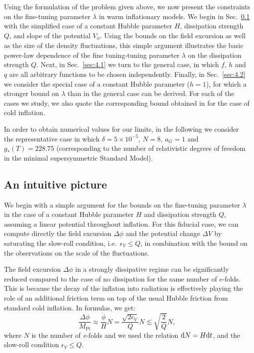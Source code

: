 \documentclass[aps,prd,twocolumn,amssymb,amsmath,floatfix,nofootinbib,superscriptaddress,preprintnumbers]{revtex4-1}
\begin{document}
Using the formulation of the problem given above,
we now present the constraints on the fine-tuning parameter $\lambda$ in warm inflationary models. We begin in Sec.~\ref{sec:4.0} with the simplified case of a constant Hubble parameter $H$, dissipation strength $Q$, and slope of the potential $V_\phi$. Using the bounds on the field excursion as well as the size of the density fluctuations, this simple argument illustrates the basic power-law dependence of the fine tuning-tuning parameter $\lambda$ on the dissipation strength $Q$. Next, in Sec.~\ref{sec:4.1} we turn to the general case, in which $f$, $h$ and $q$ are all arbitrary functions to be chosen independently. Finally, in Sec.~\ref{sec:4.2} we consider the special case of a constant Hubble parameter ($h =1$), for which a stronger bound on $\lambda$ than in the general case can be derived. For each of the cases we study, we also quote the corresponding bound obtained in \cite{Adams:1990pn} for the case of cold inflation.

In order to obtain numerical values for our limits, in the following we consider the representative case in which $\delta = 5\times 10^{-5}$, $N=8$, $a_G=1$ and $g_{*}(T)=228.75$ (corresponding to the number of relativistic degrees of freedom in the minimal supersymmetric Standard Model). 

\subsection{An intuitive picture}
\label{sec:4.0}

We begin with a simple argument for the bounds on the fine-tuning parameter $\lambda$ in the case of a constant Hubble parameter $H$ and dissipation strength $Q$, assuming a linear potential throughout inflation. For this fiducial case, we can compute directly the field excursion $\Delta\phi$ and the potential change $\Delta V$ by saturating the slow-roll condition, i.e.\ $\epsilon_V\leq Q$, in combination with the bound on the observations on the scale of the fluctuations. 

 The field excursion $\Delta\phi$ in a strongly dissipative regime can be significantly reduced compared to the case of no dissipation for the same number of $e$-folds. This is because the decay of the inflaton into radiation is effectively playing the role of an additional friction term on top of the usual Hubble friction from standard cold inflation. In formulas, we get:
\begin{equation}
    \frac{\Delta \phi}{M_{\mathrm{Pl}}}\approx\frac{\dot{\phi}}{H} N= \frac{\sqrt{2 \epsilon_V}}{Q} N\lesssim \sqrt{\frac{2}{Q}}N, \label{eq:4.0.1}
\end{equation}
where $N$ is the number of \textit{e}-folds and we used the relation ${\rm d}N=H{\rm d}t$, and  the slow-roll condition $\epsilon_V\leq Q$.
\end{document}
